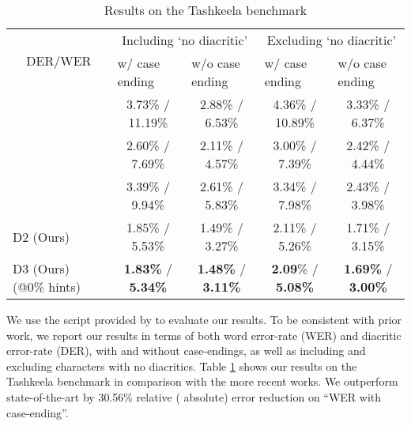 \documentclass[11pt]{article}
\begin{document}
\begin{table}[h]
\begin{tabular}{|l|c|c|c|c|}
\hline
\multicolumn{1}{|c|}{\multirow{2}{*}{DER/WER}} & \multicolumn{2}{c|}{Including `no diacritic'} & \multicolumn{2}{c|}{Excluding `no diacritic'} \\ \cline{2-5} 
\multicolumn{1}{|c|}{} & \multicolumn{1}{l|}{w/ case ending} & \multicolumn{1}{l|}{w/o case ending} & \multicolumn{1}{l|}{w/ case ending} & \multicolumn{1}{l|}{w/o case ending} \\ \hline
\cite{shakkala}         & 3.73\% / 11.19\%          & 2.88\% / 6.53\%         & 4.36\% / 10.89\%           & 3.33\% / 6.37\%            \\ \hline
\cite{fadel19-neural}   & 2.60\% / 7.69\%           & 2.11\% / 4.57\%         & 3.00\% / 7.39\%            & 2.42\% / 4.44\%            \\ \hline
\cite{hamza20}          & 3.39\% / 9.94\%           & 2.61\% / 5.83\%         & 3.34\% / 7.98\%            & 2.43\% / 3.98\%            \\ \hline
D2 (Ours)               & 1.85\% / 5.53\%           & 1.49\% / 3.27\%         & 2.11\% / 5.26\%            & 1.71\% / 3.15\%            \\ \hline
D3 (Ours) (@0\% hints)  & \textbf{1.83\%} / \textbf{5.34\%}  & \textbf{1.48\%} / \textbf{3.11\%}  & \textbf{2.09}\%  / \textbf{5.08\%}     & \textbf{1.69\%} / \textbf{3.00\%}   \\ \hline
\end{tabular}
\caption{Results on the Tashkeela benchmark}
\label{tashkeela-results}
\end{table}

We use the script provided by \cite{fadel19} to evaluate our results. To be consistent with prior work, we report our results in terms of both word error-rate (WER) and diacritic error-rate (DER), with and without case-endings, as well as including and excluding characters with no diacritics. Table \ref{tashkeela-results} shows our results on the Tashkeela benchmark in comparison with the more recent works. We outperform state-of-the-art by 30.56\% relative ( absolute) error reduction on ``WER with case-ending''.
\end{document}
